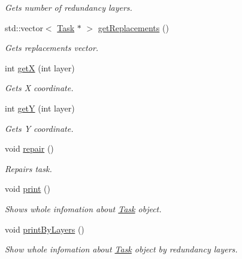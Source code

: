 \begin{DoxyCompactItemize}
\begin{DoxyCompactList}\small\item\em Gets number of redundancy layers. \end{DoxyCompactList}\item 
std\+::vector$<$ \hyperlink{classTask}{Task} $\ast$ $>$ \hyperlink{classTask_a2abeb620bbe984e126feac78fa3ab8d7}{get\+Replacements} ()\hypertarget{classTask_a2abeb620bbe984e126feac78fa3ab8d7}{}\label{classTask_a2abeb620bbe984e126feac78fa3ab8d7}

\begin{DoxyCompactList}\small\item\em Gets replacements vector. \end{DoxyCompactList}\item 
int \hyperlink{classTask_a5f2fd3ae37f5aa26cae04c55a47f11b2}{getX} (int layer)
\begin{DoxyCompactList}\small\item\em Gets X coordinate. \end{DoxyCompactList}\item 
int \hyperlink{classTask_ad0e0f34141af6ef5d713f127b5d2455b}{getY} (int layer)
\begin{DoxyCompactList}\small\item\em Gets Y coordinate. \end{DoxyCompactList}\item 
void \hyperlink{classTask_ac84383a9682166e1b92d2b7f29c77aae}{repair} ()\hypertarget{classTask_ac84383a9682166e1b92d2b7f29c77aae}{}\label{classTask_ac84383a9682166e1b92d2b7f29c77aae}

\begin{DoxyCompactList}\small\item\em Repairs task. \end{DoxyCompactList}\item 
void \hyperlink{classTask_a94c213a940fe0e9516c9098d153366fc}{print} ()\hypertarget{classTask_a94c213a940fe0e9516c9098d153366fc}{}\label{classTask_a94c213a940fe0e9516c9098d153366fc}

\begin{DoxyCompactList}\small\item\em Shows whole infomation about \hyperlink{classTask}{Task} object. \end{DoxyCompactList}\item 
void \hyperlink{classTask_ab6d8dbb773a59f5eb135daa0310d3ffd}{print\+By\+Layers} ()\hypertarget{classTask_ab6d8dbb773a59f5eb135daa0310d3ffd}{}\label{classTask_ab6d8dbb773a59f5eb135daa0310d3ffd}

\begin{DoxyCompactList}\small\item\em Show whole infomation about \hyperlink{classTask}{Task} object by redundancy layers. \end{DoxyCompactList}\end{DoxyCompactItemize}
